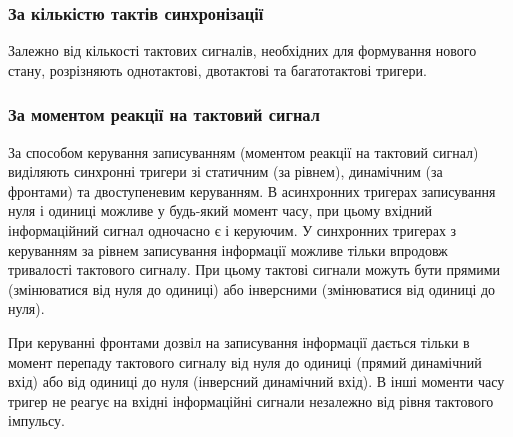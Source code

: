 \documentclass[a4paper,oneside,DIV=10,12pt]{scrartcl}
\begin{document}
			\subsubsection{За кількістю тактів синхронізації}
				Залежно від кількості тактових сигналів, необхідних для формування нового стану, розрізняють однотактові, двотактові та багатотактові тригери.
			
			\subsubsection{За моментом реакції на тактовий сигнал}
				За способом керування записуванням (моментом реакції на тактовий сигнал) виділяють синхронні тригери зі статичним (за рівнем), динамічним (за фронтами) та двоступеневим керуванням. В асинхронних тригерах записування нуля і одиниці можливе у будь-який момент часу, при цьому вхідний інформаційний сигнал одночасно є і керуючим. У синхронних тригерах з керуванням за рівнем записування інформації можливе тільки впродовж тривалості тактового сигналу. При цьому тактові сигнали можуть бути прямими (змінюватися від нуля до одиниці) або інверсними (змінюватися від одиниці до нуля).
				
				При керуванні фронтами дозвіл на записування інформації дається тільки в момент перепаду тактового сигналу від нуля до одиниці (прямий динамічний вхід) або від одиниці до нуля (інверсний динамічний вхід). В інші моменти часу тригер не реагує на вхідні інформаційні сигнали незалежно від рівня тактового імпульсу.
				
\end{document}
